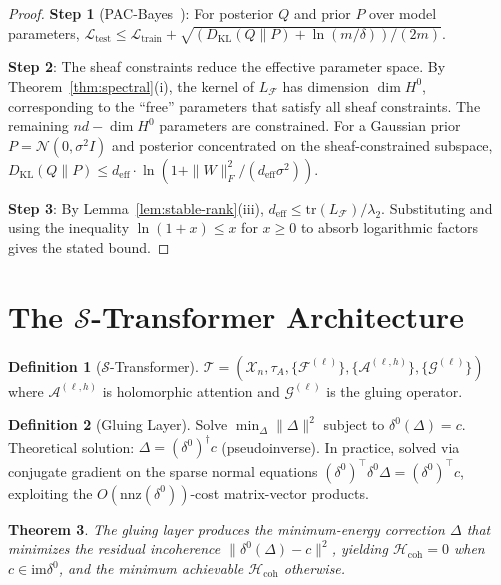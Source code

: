 \documentclass[11pt,a4paper]{article}
\theoremstyle{plain}
\newtheorem{theorem}{Theorem}[section]
\theoremstyle{definition}
\newtheorem{definition}[theorem]{Definition}
\theoremstyle{remark}
\newcommand{\cF}{\mathcal{F}}
\newcommand{\cX}{\mathcal{X}}
\newcommand{\cA}{\mathcal{A}}
\newcommand{\cS}{\mathcal{S}}
\newcommand{\cT}{\mathcal{T}}
\newcommand{\cG}{\mathcal{G}}
\newcommand{\cL}{\mathcal{L}}
\newcommand{\cN}{\mathcal{N}}
\newcommand{\tr}{\mathrm{tr}}
\newcommand{\im}{\mathrm{im}}
\newcommand{\Hcoh}{\mathcal{H}_{\mathrm{coh}}}
\begin{document}
\begin{proof}
\textbf{Step 1} (PAC-Bayes~\citep{mcallester2003}): For posterior $Q$ and prior $P$ over model parameters, $\cL_{\mathrm{test}} \leq \cL_{\mathrm{train}} + \sqrt{(D_{\mathrm{KL}}(Q\|P) + \ln(m/\delta))/(2m)}$.

\textbf{Step 2}: The sheaf constraints reduce the effective parameter space. By Theorem~\ref{thm:spectral}(i), the kernel of $L_\cF$ has dimension $\dim H^0$, corresponding to the ``free'' parameters that satisfy all sheaf constraints. The remaining $nd - \dim H^0$ parameters are constrained. For a Gaussian prior $P = \cN(0, \sigma^2 I)$ and posterior concentrated on the sheaf-constrained subspace, $D_{\mathrm{KL}}(Q\|P) \leq d_{\mathrm{eff}} \cdot \ln(1 + \|W\|_F^2/(d_{\mathrm{eff}}\sigma^2))$.

\textbf{Step 3}: By Lemma~\ref{lem:stable-rank}(iii), $d_{\mathrm{eff}} \leq \tr(L_\cF)/\lambda_2$. Substituting and using the inequality $\ln(1 + x) \leq x$ for $x \geq 0$ to absorb logarithmic factors gives the stated bound.
\end{proof}

\section{The $\cS$-Transformer Architecture}\label{sec:architecture}

\begin{definition}[$\cS$-Transformer]\label{def:s-trans}
$\cT = (\cX_n, \tau_A, \{\cF^{(\ell)}\}, \{\cA^{(\ell,h)}\}, \{\cG^{(\ell)}\})$ where $\cA^{(\ell,h)}$ is holomorphic attention and $\cG^{(\ell)}$ is the gluing operator.
\end{definition}

\begin{definition}[Gluing Layer]\label{def:gluing}
Solve $\min_\Delta \|\Delta\|^2$ subject to $\delta^0(\Delta) = c$. Theoretical solution: $\Delta = (\delta^0)^\dagger c$ (pseudoinverse). In practice, solved via conjugate gradient on the sparse normal equations $(\delta^0)^\top \delta^0 \Delta = (\delta^0)^\top c$, exploiting the $O(\mathrm{nnz}(\delta^0))$-cost matrix-vector products.
\end{definition}

\begin{theorem}\label{thm:gluing}
The gluing layer produces the minimum-energy correction $\Delta$ that minimizes the residual incoherence $\|\delta^0(\Delta) - c\|^2$, yielding $\Hcoh = 0$ when $c \in \im\delta^0$, and the minimum achievable $\Hcoh$ otherwise.
\end{theorem}
\end{document}
